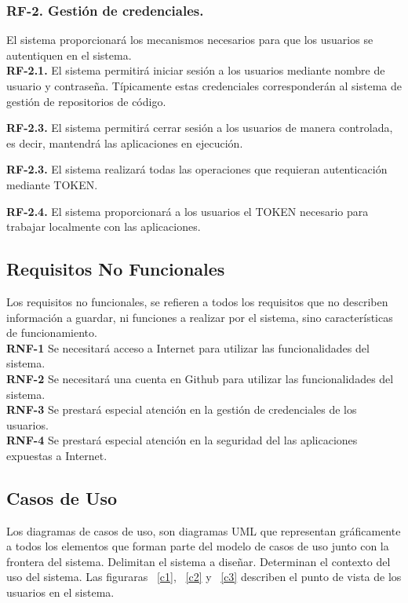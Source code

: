 \documentclass[a4paper,11pt]{book}
\begin{document}
\subsubsection { \textbf{ RF-2. Gestión de credenciales.}} El sistema proporcionará los mecanismos necesarios para que los usuarios se autentiquen en el sistema. \\


\textbf{RF-2.1.} El sistema  permitirá iniciar sesión  a los usuarios mediante nombre de usuario y contraseña. Típicamente estas credenciales corresponderán al sistema de gestión de repositorios de código.

\textbf{RF-2.3.} El sistema  permitirá cerrar sesión a los usuarios de manera controlada, es decir, mantendrá las aplicaciones en ejecución.

\textbf{RF-2.3.} El sistema  realizará todas las operaciones que requieran autenticación mediante TOKEN.

\textbf{RF-2.4.} El sistema  proporcionará a los usuarios el TOKEN necesario para trabajar localmente con las aplicaciones.


\subsection{Requisitos No Funcionales }
Los requisitos no funcionales, se refieren a todos los requisitos que no describen información a guardar, ni funciones a realizar por el sistema, sino características de funcionamiento.\\


\textbf{RNF-1} Se necesitará acceso a Internet para utilizar las funcionalidades del sistema.\\

\textbf{RNF-2} Se necesitará una cuenta en Github para utilizar las funcionalidades del sistema.\\

\textbf{RNF-3} Se prestará especial atención en la gestión de credenciales de los usuarios.\\

\textbf{RNF-4} Se prestará especial atención en la seguridad del  las aplicaciones expuestas a Internet.
\subsection{Casos de Uso}
Los diagramas de casos de uso, son diagramas UML que representan gráficamente a todos los elementos que forman parte del modelo de casos de uso junto con la frontera del sistema. Delimitan el sistema a diseñar. Determinan el contexto del uso del sistema. Las figuraras ~\ref{c1}, ~\ref{c2}  y ~\ref{c3} describen el punto de vista de los usuarios  en el sistema.
\end{document}
